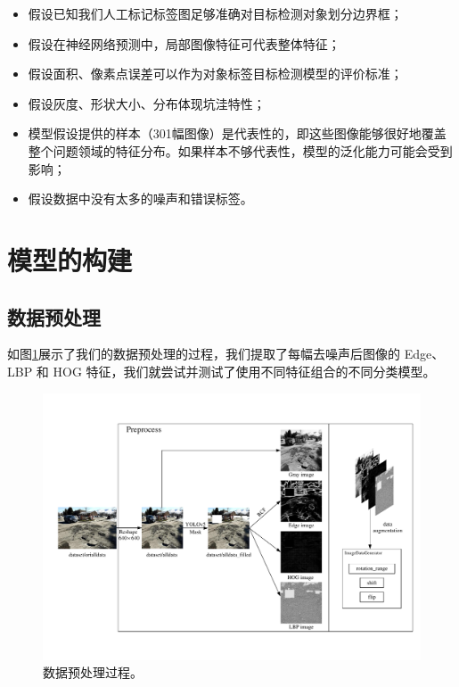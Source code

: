 \documentclass[a4paper, 10pt]{article}
\begin{document}
	\begin{itemize}
		\item [(1)]
		假设已知我们人工标记标签图足够准确对目标检测对象划分边界框；
		
		\item [(2)]
		假设在神经网络预测中，局部图像特征可代表整体特征；
		
		\item[(3)]
		假设面积、像素点误差可以作为对象标签目标检测模型的评价标准；
		
		\item[(4)]
		假设灰度、形状大小、分布体现坑洼特性；
		
		\item[(5)]
		模型假设提供的样本（301幅图像）是代表性的，即这些图像能够很好地覆盖整个问题领域的特征分布。如果样本不够代表性，模型的泛化能力可能会受到影响；
		
		\item[(6)]
		假设数据中没有太多的噪声和错误标签。
		
	\end{itemize}
	
	\section{模型的构建}
	
	\subsection{数据预处理}
	
	如图\ref{fig: ppreprocess}展示了我们的数据预处理的过程，我们提取了每幅去噪声后图像的 Edge、LBP 和 HOG 特征，我们就尝试并测试了使用不同特征组合的不同分类模型。
	
	\begin{figure}[htb]
		\centering 
		\includegraphics[width=0.8\columnwidth]{picture/preprocess}
		\caption{
			\label{fig: ppreprocess} 
			数据预处理过程。
		}
	\end{figure}
	
\end{document}
